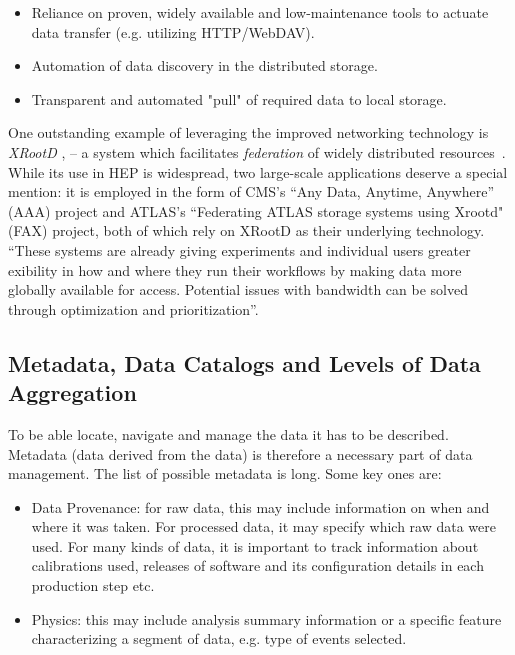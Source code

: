 \begin{itemize}
	\item Reliance on proven, widely available and low-maintenance tools to actuate data transfer (e.g. utilizing HTTP/WebDAV).
	\item Automation of data discovery in the distributed storage.
	\item Transparent and automated "pull" of required data to local storage.
\end{itemize}

One outstanding example of leveraging the improved networking technology is \textit{XRootD}
\cite{xrootd}, \cite{xrootd_web} -- a system which facilitates \textit{federation} of widely 
distributed resources~\cite{xrootd_fed,xrootd_snowmass}. While its use in HEP is widespread, two large-scale applications deserve a special mention: 
it is employed  in the form of CMS's ``Any Data, Anytime, Anywhere'' (AAA)
project and ATLAS's ``Federating ATLAS storage systems using Xrootd" (FAX) project, both of which rely
on XRootD as their underlying technology. ``These systems are already giving experiments and
individual users greater exibility in how and where they run their workflows by making data more globally
available for access. Potential issues with bandwidth can be solved through optimization and prioritization''\cite{xrootd_snowmass}.


\subsection{Metadata, Data Catalogs and Levels of Data Aggregation}
To be able locate, navigate and manage the data it has to be described. Metadata (data derived from the data) is therefore a necessary
part of data management. The  list of possible metadata is long. Some key ones are:

\begin{itemize}
\item Data Provenance: for raw data, this may include information on when and where it was taken. For processed data,
it may specify which raw data were used. For many kinds of data, it is important to track information about calibrations used,
releases of software and its configuration details in each production step etc.

\item Physics: this may include analysis summary information or a specific feature characterizing a segment of data, e.g. type of events selected.
\end{itemize}

